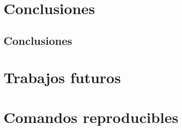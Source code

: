 \documentclass[12pt,oneside]{report}
\begin{document}
\chapter{Conclusiones}

\section{Conclusiones}

\mbox{}

\chapter{Trabajos futuros}

\mbox{}

\appendix

\chapter{Comandos reproducibles}

\mbox{}
\end{document}
